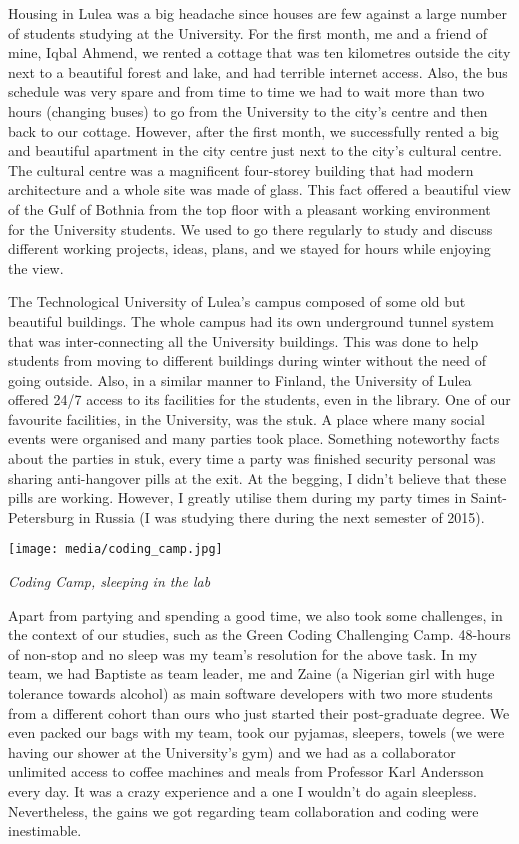 \documentclass[10pt,a4paper]{article} %
\begin{document}
\begin{multicols}{3}
Housing in Lulea was a big headache since houses are few against a large number of students
studying at the University. 
For the first month, me and a friend of mine, Iqbal Ahmend, we rented a cottage 
that was ten kilometres outside the city next to a beautiful forest and lake, and 
had terrible internet access. 
Also, the bus schedule was very spare and from time to time we had to wait more 
than two hours (changing buses) to go from the University to the city's centre and then 
back to our cottage. 
However, after the first month, we successfully rented a big and beautiful apartment 
in the city centre just next to the city's cultural centre. 
The cultural centre was a magnificent four-storey building that had modern architecture and 
a whole site was made of glass. 
This fact offered a beautiful view of the Gulf of Bothnia from the top floor with 
a pleasant working environment for the University students. 
We used to go there regularly to study and discuss different working projects, ideas, plans, 
and we stayed for hours while enjoying the view.

The Technological University of Lulea's campus composed of some old but 
beautiful buildings. 
The whole campus had its own underground tunnel system that was inter-connecting 
all the University buildings. 
This was done to help students from moving to different buildings during winter 
without the need of going outside. 
Also, in a similar manner to Finland, the University of Lulea offered 24/7 access 
to its facilities for the students, even in the library. 
One of our favourite facilities, in the University, was the {\sc stuk}. 
A place where many social events were organised and many parties took place.
Something noteworthy facts about the parties in {\sc stuk}, every time a party 
was finished security personal was sharing anti-hangover pills at the exit. 
At the begging, I didn't believe that these pills are working. 
However, I greatly 
utilise them during my party times in Saint-Petersburg in Russia (I was 
studying there during the next semester of 2015).

\begin{center}
	\texttt{[image: media/coding\_camp.jpg]}
	\par\textit{Coding Camp, sleeping in the lab}
\end{center}
  
Apart from partying and spending a good time, we also took some challenges, in the 
context of our studies, such as the Green Coding Challenging Camp.
48-hours of non-stop and no sleep was my team's resolution for the above task. 
In my team, we had Baptiste as team leader, me and Zaine (a Nigerian girl with huge 
tolerance towards alcohol) as main software developers with two more students 
from a different cohort than ours who just started their post-graduate degree.  
We even packed our bags with my team, took our pyjamas, sleepers, towels 
(we were having our shower at the University's gym) and we had as a collaborator 
unlimited access to coffee machines and meals from Professor Karl Andersson every 
day. 
It was a crazy experience and a one I wouldn't do again sleepless. 
Nevertheless, the gains we got regarding team collaboration and coding were 
inestimable.


\end{multicols}
\end{document}
